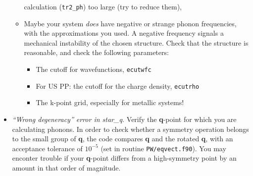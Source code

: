 \documentclass[12pt]{article}
\begin{document}
\begin{itemize}
\begin{itemize}
      calculation ({\tt tr2\_ph}) too large (try to reduce them),
      \item Maybe your system {\em does} have negative or strange phonon
      frequencies, with the approximations you used. A negative frequency
      signals a mechanical instability of the chosen structure. Check that
      the structure is reasonable, and check the following parameters:
      \begin{itemize}
      \item The cutoff for wavefunctions, {\tt ecutwfc}
      \item For US PP: the cutoff for the charge density, {\tt ecutrho}
      \item The k-point grid, especially for metallic systems!
      \end{itemize}
      \end{itemize}
\item {\em ``Wrong degeneracy'' error in star\_q.}
      Verify the {\bf q}-point for which you are calculating phonons.
      In order to check whether a symmetry operation belongs
      to the small group of {\bf q}, the code compares {\bf q} 
      and the rotated {\bf q}, with an acceptance tolerance of 
      $10^{-5}$ (set in routine {\tt PW/eqvect.f90}). You may 
      enconter trouble if your {\bf q}-point differs from a
      high-symmetry point by an amount in that order of magnitude.
\end{itemize}
\end{document}
